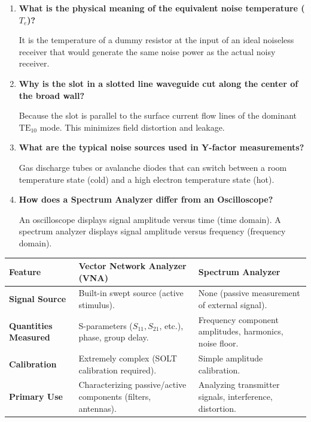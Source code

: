 \documentclass[12pt,a4paper]{article}
\newcommand{\Q}[1]{\textbf{#1}\par\noindent\ignorespaces}
\renewcommand{\arraystretch}{1.45}
\begin{document}
\begin{tcolorbox}[exambox, title={\textbf{Frequently Asked / Viva Questions}}]
\begin{enumerate}[topsep=0pt, label=\textbf{Q\arabic*.}, itemsep=5pt]
  \item \Q{What is the physical meaning of the equivalent noise temperature ($T_e$)?}
    It is the temperature of a dummy resistor at the input of an ideal noiseless receiver that would generate the same noise power as the actual noisy receiver.
  \item \Q{Why is the slot in a slotted line waveguide cut along the center of the broad wall?}
    Because the slot is parallel to the surface current flow lines of the dominant $\text{TE}_{10}$ mode. This minimizes field distortion and leakage.
  \item \Q{What are the typical noise sources used in Y-factor measurements?}
    Gas discharge tubes or avalanche diodes that can switch between a room temperature state (cold) and a high electron temperature state (hot).
  \item \Q{How does a Spectrum Analyzer differ from an Oscilloscope?}
    An oscilloscope displays signal amplitude versus time (time domain). A spectrum analyzer displays signal amplitude versus frequency (frequency domain).
\end{enumerate}
\end{tcolorbox}

\begin{tcolorbox}[tikzbox, title={Comparison of VNA and Spectrum Analyzer}]
\renewcommand{\arraystretch}{1.4}
\par\noindent
{\renewcommand{\arraystretch}{1.65}%
\begin{tabularx}{\linewidth}{|B{3.0cm}|Y|Y|}\hline
\textbf{Feature} & \textbf{Vector Network Analyzer (VNA)} & \textbf{Spectrum Analyzer} \\
\hline
\textbf{Signal Source} & Built-in swept source (active stimulus). & None (passive measurement of external signal). \\[4pt]
\hline
\textbf{Quantities Measured} & S-parameters ($S_{11}, S_{21}$, etc.), phase, group delay. & Frequency component amplitudes, harmonics, noise floor. \\[4pt]
\hline
\textbf{Calibration} & Extremely complex (SOLT calibration required). & Simple amplitude calibration. \\[4pt]
\hline
\textbf{Primary Use} & Characterizing passive/active components (filters, antennas). & Analyzing transmitter signals, interference, distortion. \\[4pt]
\hline
\end{tabularx}
}
\end{tcolorbox}
\end{document}
